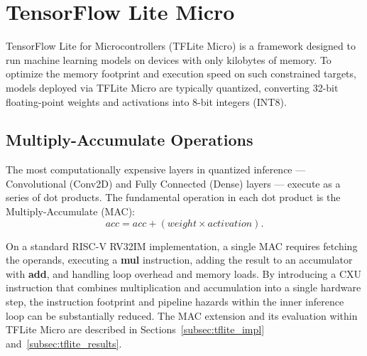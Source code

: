 \section{TensorFlow Lite Micro}
\label{sec:tflite}

TensorFlow Lite for Microcontrollers (TFLite Micro) \cite{David2021TFLiteMicro} is a
framework designed to run machine learning models on devices with only kilobytes of
memory.
To optimize the memory footprint and execution speed on such constrained targets,
models deployed via TFLite Micro are typically quantized, converting 32-bit
floating-point weights and activations into 8-bit integers (INT8).

\subsection{Multiply-Accumulate Operations}
\label{subsec:mac}

The most computationally expensive layers in quantized inference --- Convolutional
(Conv2D) and Fully Connected (Dense) layers --- execute as a series of dot products.
The fundamental operation in each dot product is the Multiply-Accumulate (MAC):
$$
acc = acc + (weight \times activation).
$$

On a standard RISC-V RV32IM implementation, a single MAC requires fetching the
operands, executing a \textbf{mul} instruction, adding the result to an accumulator
with \textbf{add}, and handling loop overhead and memory loads.
By introducing a CXU instruction that combines multiplication and accumulation into a
single hardware step, the instruction footprint and pipeline hazards within the inner
inference loop can be substantially reduced.
The MAC extension and its evaluation within TFLite Micro are described in
Sections~\ref{subsec:tflite_impl} and~\ref{subsec:tflite_results}.
